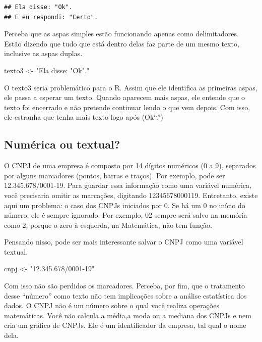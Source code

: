 \documentclass[
]{book}
\newenvironment{Shaded}{\begin{snugshade}}{\end{snugshade}}
\newcommand{\NormalTok}[1]{#1}
\newcommand{\OtherTok}[1]{\textcolor[rgb]{0.56,0.35,0.01}{#1}}
\newcommand{\StringTok}[1]{\textcolor[rgb]{0.31,0.60,0.02}{#1}}
\begin{document}
\begin{verbatim}
## Ela disse: "Ok".
## E eu respondi: "Certo".
\end{verbatim}

Perceba que as aspas simples estão funcionando apenas como delimitadores. Estão dizendo que tudo que está dentro delas faz parte de um mesmo texto, inclusive as aspas duplas.

\begin{Shaded}
\begin{Highlighting}[]
\NormalTok{texto3 }\OtherTok{\textless{}{-}} \StringTok{"Ela disse: "}\NormalTok{Ok}\StringTok{"."}
\end{Highlighting}
\end{Shaded}

O texto3 seria problemático para o R. Assim que ele identifica as primeiras aspas, ele passa a esperar um texto. Quando aparecem mais aspas, ele entende que o texto foi encerrado e não pretende continuar lendo o que vem depois. Com isso, ele estranha que tenha mais texto logo após (Ok``.'')

\hypertarget{numuxe9rica-ou-textual}{%
\subsection{Numérica ou textual?}\label{numuxe9rica-ou-textual}}

O CNPJ de uma empresa é composto por 14 dígitos numéricos (0 a 9), separados por alguns marcadores (pontos, barras e traços). Por exemplo, pode ser 12.345.678/0001-19. Para guardar essa informação como uma variável numérica, você precisaria omitir as marcações, digitando 12345678000119. Entretanto, existe aqui um problema: o caso dos CNPJs iniciados por 0. Se há um 0 no início do número, ele é sempre ignorado. Por exemplo, 02 sempre será salvo na memória como 2, porque o zero à esquerda, na Matemática, não tem função.

Pensando nisso, pode ser mais interessante salvar o CNPJ como uma variável textual.

\begin{Shaded}
\begin{Highlighting}[]
\NormalTok{cnpj }\OtherTok{\textless{}{-}} \StringTok{"12.345.678/0001{-}19"}
\end{Highlighting}
\end{Shaded}

Com isso não são perdidos os marcadores. Perceba, por fim, que o tratamento desse ``número'' como texto não tem implicações sobre a análise estatística dos dados. O CNPJ não é um número sobre o qual você realiza operações matemáticas. Você não calcula a média,a moda ou a mediana dos CNPJs e nem cria um gráfico de CNPJs. Ele é um identificador da empresa, tal qual o nome dela.
\end{document}
